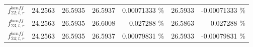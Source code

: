 \begin{table}
\begin{tabular}{| l | r | r | r  r | r  r |}
                                                          $f_{22; t, r}^{banff}$ &         24.2563 & 26.5935 & 26.5937 &      0.00071333 \%  &         26.5933 &     -0.00071333 \%  \\ 
                                                          $f_{23; t, r}^{banff}$ &         24.2563 & 26.5935 & 26.6008 &        0.027288 \%  &         26.5863 &       -0.027288 \%  \\ 
                                                          $f_{24; t, r}^{banff}$ &         24.2563 & 26.5935 & 26.5937 &      0.00079831 \%  &         26.5933 &     -0.00079831 \%  \\ 

\end{tabular}
\end{table}
